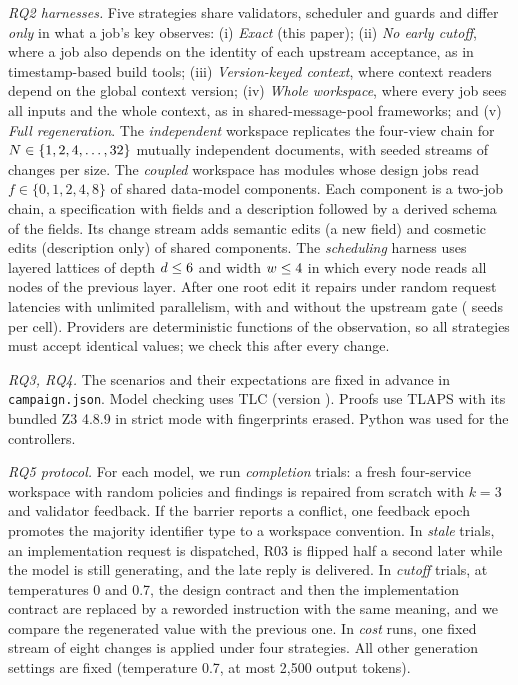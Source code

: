 \emph{RQ2 harnesses.} Five strategies share validators, scheduler and guards and differ \emph{only} in what a job's key observes: (i) \emph{Exact} (this paper); (ii) \emph{No early cutoff}, where a job also depends on the identity of each upstream acceptance, as in timestamp-based build tools; (iii) \emph{Version-keyed context}, where context readers depend on the global context version; (iv) \emph{Whole workspace}, where every job sees all inputs and the whole context, as in shared-message-pool frameworks; and (v) \emph{Full regeneration}. The \emph{independent} workspace replicates the four-view chain for $N\in\{1,2,4,\ldots,32\}$ mutually independent documents, with \CostSeeds{} seeded streams of \CostChanges{} changes per size. The \emph{coupled} workspace has \CoupledModules{} modules whose design jobs read $f\in\{0,1,2,4,8\}$ of \CoupledShared{} shared data-model components. Each component is a two-job chain, a specification with fields and a description followed by a derived schema of the fields. Its change stream adds semantic edits (a new field) and cosmetic edits (description only) of shared components. The \emph{scheduling} harness uses layered lattices of depth $d\le6$ and width $w\le4$ in which every node reads all nodes of the previous layer. After one root edit it repairs under random request latencies with unlimited parallelism, with and without the upstream gate (\SchedSeeds{} seeds per cell). Providers are deterministic functions of the observation, so all strategies must accept identical values; we check this after every change.

\emph{RQ3, RQ4.} The \Scenarios{} scenarios and their expectations are fixed in advance in \texttt{campaign.json}. Model checking uses TLC (version \TLCExtVersion). Proofs use TLAPS with its bundled Z3 4.8.9 in strict mode with fingerprints erased. Python \PythonVersion{} was used for the controllers.

\emph{RQ5 protocol.} For each model, we run \emph{completion} trials: a fresh four-service workspace with random policies and findings is repaired from scratch with $k=3$ and validator feedback. If the barrier reports a conflict, one feedback epoch promotes the majority identifier type to a workspace convention. In \emph{stale} trials, an implementation request is dispatched, R03 is flipped half a second later while the model is still generating, and the late reply is delivered. In \emph{cutoff} trials, at temperatures 0 and 0.7, the design contract and then the implementation contract are replaced by a reworded instruction with the same meaning, and we compare the regenerated value with the previous one. In \emph{cost} runs, one fixed stream of eight changes is applied under four strategies. All other generation settings are fixed (temperature 0.7, at most 2,500 output tokens).


